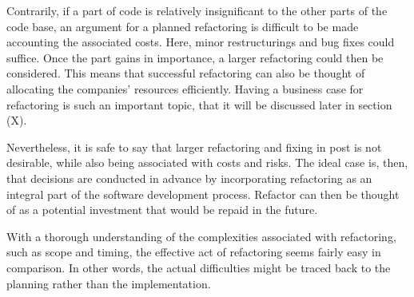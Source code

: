 Contrarily, 
	if a part of code is relatively insignificant 
	to the other parts of the code base, 
	an argument for a planned refactoring is difficult 
	to be made accounting the associated costs. 
Here, minor restructurings and bug fixes could suffice. 
Once the part gains in importance, 
	a larger refactoring could then be considered. 
This means that successful refactoring can also be thought of 
	allocating the companies' resources efficiently. 
Having a business case for refactoring is such an important topic, 
	that it will be discussed later in section (X).

Nevertheless, it is safe to say 
	that larger refactoring and fixing in post is not desirable, 
	while also being associated with costs and risks. 
The ideal case is, then, 
	that decisions are conducted in advance 
	by incorporating refactoring as an integral part 
	of the software development process.
Refactor can then be thought of as a 
	potential investment that would be repaid in the future. 






With a thorough understanding of the complexities 
	associated with refactoring, 
	such as scope and timing, 
	the effective act of refactoring seems fairly easy in comparison. 
In other words, 
	the actual difficulties
	might be traced back to the planning rather than the implementation. 

